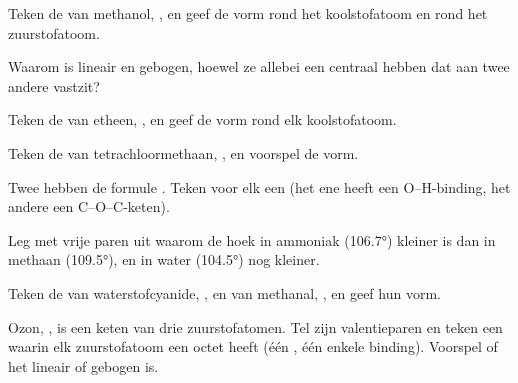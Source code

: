 \begin{exercise}[$\star\star$]\label{exo:g10:lewis-and-shape:8}
Teken de  van methanol, , en geef de vorm rond
het koolstofatoom en rond het zuurstofatoom.
\end{exercise}

\begin{exercise}[$\star\star$]\label{exo:g10:lewis-and-shape:9}
Waarom is  lineair en  gebogen, hoewel ze allebei een
centraal  hebben dat aan twee andere vastzit?
\end{exercise}

\begin{exercise}[$\star\star$]\label{exo:g10:lewis-and-shape:10}
Teken de  van etheen, , en geef de vorm rond elk
koolstofatoom.
\end{exercise}

\begin{exercise}[$\star\star$]\label{exo:g10:lewis-and-shape:11}
Teken de  van tetrachloormethaan, , en voorspel
de vorm.
\end{exercise}

\begin{exercise}[$\star\star\star$]\label{exo:g10:lewis-and-shape:12}
Twee  hebben de formule . Teken voor elk een
 (het ene heeft een O--H-binding, het andere een
C--O--C-keten).
\end{exercise}

\begin{exercise}[$\star\star\star$]\label{exo:g10:lewis-and-shape:13}
Leg met vrije paren uit waarom de hoek in ammoniak (\ang{106.7}) kleiner
is dan in methaan (\ang{109.5}), en in water (\ang{104.5}) nog kleiner.
\end{exercise}

\begin{exercise}[$\star\star\star$]\label{exo:g10:lewis-and-shape:14}
Teken de  van waterstofcyanide, , en van methanal,
, en geef hun vorm.
\end{exercise}

\begin{exercise}[$\star\star\star$]\label{exo:g10:lewis-and-shape:15}
Ozon, , is een keten van drie zuurstofatomen. Tel zijn
valentieparen en teken een  waarin elk zuurstofatoom een
octet heeft (één , één enkele binding). Voorspel of het
 lineair of gebogen is.
\end{exercise}

